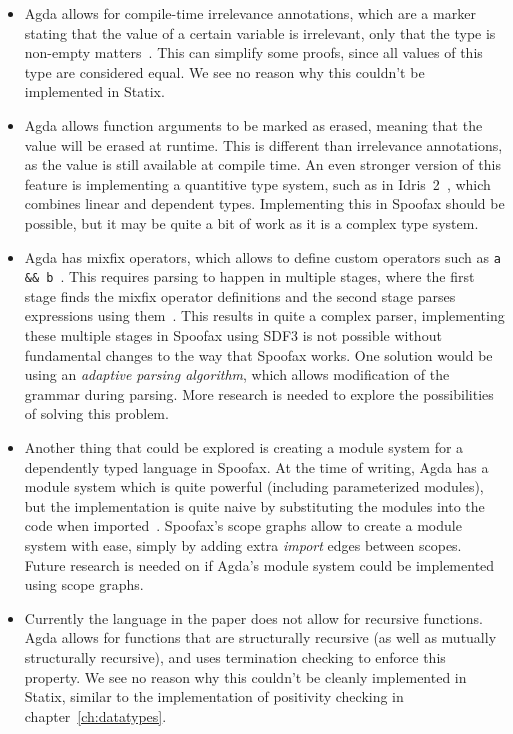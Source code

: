 \begin{itemize}
	\item Agda allows for compile-time irrelevance annotations, which are a marker stating that the value of a certain variable is irrelevant, only that the type is non-empty matters~\cite[Irrelevance]{agda}. This can simplify some proofs, since all values of this type are considered equal. We see no reason why this couldn't be implemented in Statix.
	\item Agda allows function arguments to be marked as erased, meaning that the value will be erased at runtime. This is different than irrelevance annotations, as the value is still available at compile time. An even stronger version of this feature is implementing a quantitive type system, such as in Idris~2~\cite{idris2}, which combines linear and dependent types. Implementing this in Spoofax should be possible, but it may be quite a bit of work as it is a complex type system.
	\item Agda has mixfix operators, which allows to define custom operators such as \verb|a && b|~\cite[Mixfix Operators]{agda}. This requires parsing to happen in multiple stages, where the first stage finds the mixfix operator definitions and the second stage parses expressions using them~\cite{mixfix}. This results in quite a complex parser, implementing these multiple stages in Spoofax using SDF3 is not possible without fundamental changes to the way that Spoofax works. One solution would be using an \emph{adaptive parsing algorithm}, which allows modification of the grammar during parsing. More research is needed to explore the possibilities of solving this problem.
	\item Another thing that could be explored is creating a module system for a dependently typed language in Spoofax. At the time of writing, Agda has a module system which is quite powerful (including parameterized modules), but the implementation is quite naive by substituting the modules into the code when imported~\cite[Modules]{agda}. Spoofax's scope graphs allow to create a module system with ease, simply by adding extra \emph{import} edges between scopes. Future research is needed on if Agda's module system could be implemented using scope graphs.
	\item Currently the language in the paper does not allow for recursive functions. Agda allows for functions that are structurally recursive (as well as mutually structurally recursive), and uses termination checking to enforce this property. We see no reason why this couldn't be cleanly implemented in Statix, similar to the implementation of positivity checking in chapter~\ref{ch:datatypes}.
\end{itemize}

